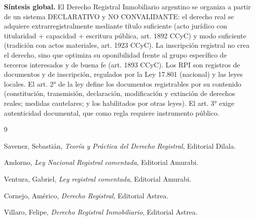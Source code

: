 \documentclass[12pt,oneside]{book}
\begin{document}
\begin{important}
\textbf{Síntesis global.} El Derecho Registral Inmobiliario argentino se organiza a partir de un sistema DECLARATIVO y NO CONVALIDANTE: el derecho real se adquiere extrarregistralmente mediante título suficiente (acto jurídico con titularidad + capacidad + escritura pública, art. 1892 CCyC) y modo suficiente (tradición con actos materiales, art. 1923 CCyC). La inscripción registral no crea el derecho, sino que optimiza su oponibilidad frente al grupo específico de terceros interesados y de buena fe (art. 1893 CCyC). Los RPI son registros de documentos y de inscripción, regulados por la Ley 17.801 (nacional) y las leyes locales. El art. 2° de la ley define los documentos registrables por su contenido (constitución, transmisión, declaración, modificación y extinción de derechos reales; medidas cautelares; y los habilitados por otras leyes). El art. 3° exige autenticidad documental, que como regla requiere instrumento público.
\end{important}


\begin{thebibliography}{9}

Savenez, Sebastián,
\textit{Teoría y Práctica del Derecho Registral},
Editorial Dilala.

Andorno,
\textit{Ley Nacional Registral comentada},
Editorial Amurabi.

Ventura, Gabriel,
\textit{Ley registral comentada},
Editorial Amurabi.

Cornejo, Américo,
\textit{Derecho Registral},
Editorial Astrea.

Villaro, Felipe,
\textit{Derecho Registral Inmobiliario},
Editorial Astrea.

\end{thebibliography}
\end{document}
